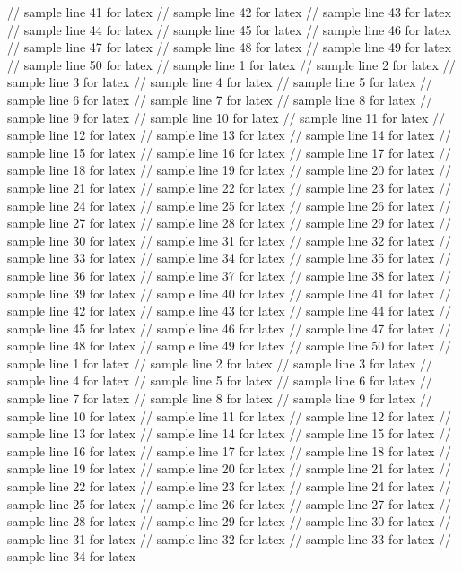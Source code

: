 // sample line 41 for latex
// sample line 42 for latex
// sample line 43 for latex
// sample line 44 for latex
// sample line 45 for latex
// sample line 46 for latex
// sample line 47 for latex
// sample line 48 for latex
// sample line 49 for latex
// sample line 50 for latex
// sample line 1 for latex
// sample line 2 for latex
// sample line 3 for latex
// sample line 4 for latex
// sample line 5 for latex
// sample line 6 for latex
// sample line 7 for latex
// sample line 8 for latex
// sample line 9 for latex
// sample line 10 for latex
// sample line 11 for latex
// sample line 12 for latex
// sample line 13 for latex
// sample line 14 for latex
// sample line 15 for latex
// sample line 16 for latex
// sample line 17 for latex
// sample line 18 for latex
// sample line 19 for latex
// sample line 20 for latex
// sample line 21 for latex
// sample line 22 for latex
// sample line 23 for latex
// sample line 24 for latex
// sample line 25 for latex
// sample line 26 for latex
// sample line 27 for latex
// sample line 28 for latex
// sample line 29 for latex
// sample line 30 for latex
// sample line 31 for latex
// sample line 32 for latex
// sample line 33 for latex
// sample line 34 for latex
// sample line 35 for latex
// sample line 36 for latex
// sample line 37 for latex
// sample line 38 for latex
// sample line 39 for latex
// sample line 40 for latex
// sample line 41 for latex
// sample line 42 for latex
// sample line 43 for latex
// sample line 44 for latex
// sample line 45 for latex
// sample line 46 for latex
// sample line 47 for latex
// sample line 48 for latex
// sample line 49 for latex
// sample line 50 for latex
// sample line 1 for latex
// sample line 2 for latex
// sample line 3 for latex
// sample line 4 for latex
// sample line 5 for latex
// sample line 6 for latex
// sample line 7 for latex
// sample line 8 for latex
// sample line 9 for latex
// sample line 10 for latex
// sample line 11 for latex
// sample line 12 for latex
// sample line 13 for latex
// sample line 14 for latex
// sample line 15 for latex
// sample line 16 for latex
// sample line 17 for latex
// sample line 18 for latex
// sample line 19 for latex
// sample line 20 for latex
// sample line 21 for latex
// sample line 22 for latex
// sample line 23 for latex
// sample line 24 for latex
// sample line 25 for latex
// sample line 26 for latex
// sample line 27 for latex
// sample line 28 for latex
// sample line 29 for latex
// sample line 30 for latex
// sample line 31 for latex
// sample line 32 for latex
// sample line 33 for latex
// sample line 34 for latex
